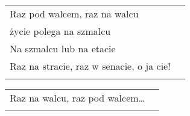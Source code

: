 \documentclass[a5paper]{article}
\begin{document}
\noindent
\begin{tabular}{@{}p{6.50cm}p{3cm}@{}}
Raz pod walcem, raz na walcu \\
życie polega na szmalcu \\
Na szmalcu lub na etacie \\
Raz na stracie, raz w senacie, o ja cie! \\ \\
\end{tabular}

\noindent
\begin{tabular}{@{}p{6.50cm}p{3cm}@{}}
Raz na walcu, raz pod walcem… \\ \\
\end{tabular}
\end{document}
